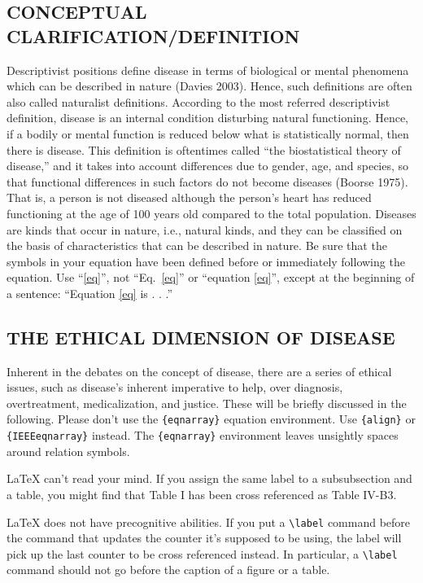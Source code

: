 \documentclass[conference]{IEEEtran}
\begin{document}
\subsection{CONCEPTUAL CLARIFICATION/DEFINITION}
Descriptivist positions deﬁne disease in terms of biological or mental phenomena which can be described in nature (Davies 2003). Hence, such deﬁnitions are often also called naturalist deﬁnitions. According to the most referred descriptivist deﬁnition, disease is an internal condition disturbing natural functioning. Hence, if a bodily or mental function is reduced below what is statistically normal, then there is disease. This deﬁnition is oftentimes called “the biostatistical theory of disease,” and it takes into account differences due to gender, age, and species, so that functional differences in such factors do not become diseases (Boorse 1975). That is, a person is not diseased although the person’s heart has reduced functioning at the age of 100 years old compared to the total population. Diseases are kinds that occur in nature, i.e., natural kinds, and they can be classiﬁed on the basis of characteristics that can be described in nature.
Be sure that the 
symbols in your equation have been defined before or immediately following 
the equation. Use ``\eqref{eq}'', not ``Eq.~\eqref{eq}'' or ``equation \eqref{eq}'', except at 
the beginning of a sentence: ``Equation \eqref{eq} is . . .''

\subsection{THE ETHICAL DIMENSION OF DISEASE}

Inherent in the debates on the concept of disease, there are a series of ethical issues, such as disease’s inherent imperative to help, over diagnosis, overtreatment, medicalization, and justice. These will be brieﬂy discussed in the following.
Please don't use the \verb|{eqnarray}| equation environment. Use
\verb|{align}| or \verb|{IEEEeqnarray}| instead. The \verb|{eqnarray}|
environment leaves unsightly spaces around relation symbols.

{\LaTeX} can't read your mind. If you assign the same label to a
subsubsection and a table, you might find that Table I has been cross
referenced as Table IV-B3. 

{\LaTeX} does not have precognitive abilities. If you put a
\verb|\label| command before the command that updates the counter it's
supposed to be using, the label will pick up the last counter to be
cross referenced instead. In particular, a \verb|\label| command
should not go before the caption of a figure or a table.
\end{document}
